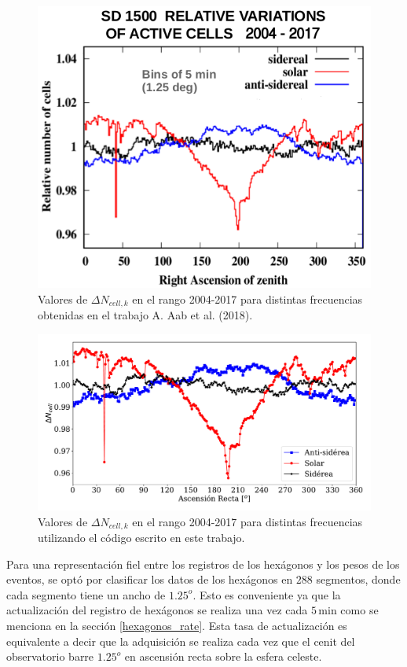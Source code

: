       \begin{figure}[H]
          \centering
              \includegraphics[width=0.6\linewidth]{pesos_referencia.png}  
              \caption{Valores de $\Delta N_{cell, k}$ en el rango 2004-2017 para distintas frecuencias obtenidas en el trabajo A. Aab et al. (2018).}
              \label{fig:pesos_referencia}
        \end{figure}

       \begin{figure}[H]
          \centering
              \includegraphics[width=0.8\linewidth]{weigths_2004-2017.pdf}
              \caption{Valores de $\Delta N_{cell, k}$ en el rango 2004-2017 para distintas frecuencias utilizando el código escrito en este trabajo.}
              \label{fig:pesos_ejemplo}
        \end{figure}

    Para una representación fiel entre los registros de los hexágonos y los pesos de los eventos, se optó por clasificar los datos de los hexágonos en $288$ segmentos, donde cada segmento tiene un ancho de $1.25^o$. Esto es conveniente ya que la actualización del registro de hexágonos se realiza una vez  cada $5\,$min como se menciona en la sección \ref{hexagonos_rate}. Esta tasa de actualización es equivalente a decir que la adquisición se realiza cada vez que el cenit del observatorio barre  $1.25^o$ en ascensión recta sobre la esfera celeste.



